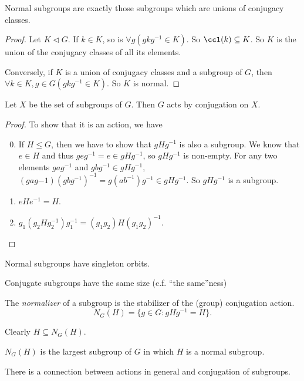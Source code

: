 \documentclass[a4pape]{article}
\begin{document}
\begin{prop}
  Normal subgroups are exactly those subgroups which are unions of conjugacy classes.
\end{prop}

\begin{proof}
  Let $K\lhd G$. If $k\in K$, so is $\forall g(gkg^{-1}\in K)$. So $\ccl(k)\subseteq K$. So $K$ is the union of the conjugacy classes of all its elements.

  Conversely, if $K$ is a union of conjugacy classes and a subgroup of $G$, then $\forall k\in K, g\in G(gkg^{-1}\in K)$. So $K$ is normal.
\end{proof}

\begin{lemma}
  Let $X$ be the set of subgroups of $G$. Then $G$ acts by conjugation on $X$. 
\end{lemma}

\begin{proof}
  To show that it is an action, we have
  \begin{enumerate}[label=\arabic{*}.]
    \setcounter{enumi}{-1}
  \item If $H\leq G$, then we have to show that $gHg^{-1}$ is also a subgroup. We know that $e\in H$ and thus $geg^{-1} = e\in gHg^{-1}$, so $gHg^{-1}$ is non-empty. For any two elements $gag^{-1}$ and $gbg^{-1}\in gHg^{-1}$, $(gag{-1})(gbg^{-1})^{-1} = g(ab^{-1})g^{-1}\in gHg^{-1}$. So $gHg^{-1}$ is a subgroup.
  \item $eHe^{-1} = H$.
  \item $g_1(g_2Hg_2^{-1})g_1^{-1} = (g_1g_2)H(g_1g_2)^{-1}$.
  \end{enumerate}
\end{proof}
\note Normal subgroups have singleton orbits.

\note Conjugate subgroups have the same size (c.f. ``the same''ness)

\begin{defi}
  The \emph{normalizer} of a subgroup is the stabilizer of the (group) conjugation action.
  \[
  N_G(H) = \{g\in G: gHg^{-1} = H\}.
  \]
\end{defi}
\note Clearly $H\subseteq N_G(H)$.

\begin{prop}
  $N_G(H)$ is the largest subgroup of $G$ in which $H$ is a normal subgroup.
\end{prop}

There is a connection between actions in general and conjugation of subgroups.
\end{document}
